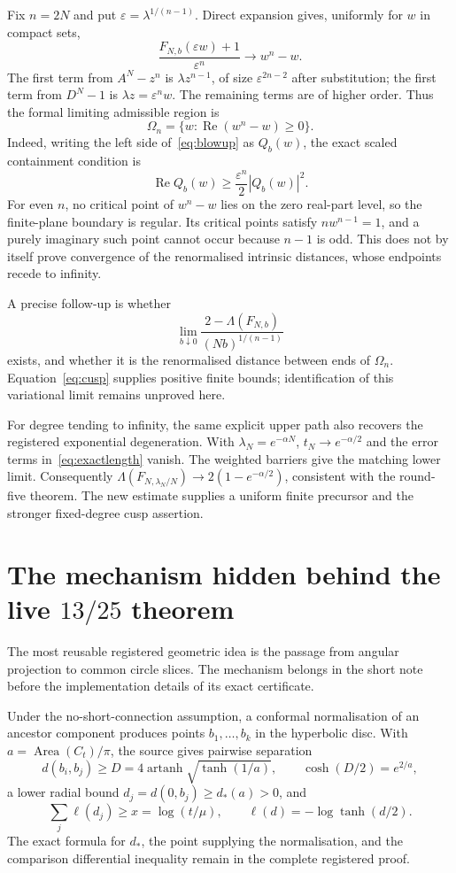 \documentclass[11pt,a4paper]{article}
\theoremstyle{remark}\newtheorem{remark}[theorem]{Remark}
\newcommand{\Area}{\operatorname{Area}}
\newcommand{\Rea}{\operatorname{Re}}
\begin{document}
Fix $n=2N$ and put $\varepsilon=\lambda^{1/(n-1)}$. Direct expansion gives,
uniformly for $w$ in compact sets,
\begin{equation}\label{eq:blowup}
 \frac{F_{N,b}(\varepsilon w)+1}{\varepsilon^n}
 \longrightarrow w^n-w.
\end{equation}
The first term from $A^N-z^n$ is $\lambda z^{n-1}$, of size
$\varepsilon^{2n-2}$ after substitution; the first term from $D^N-1$ is
$\lambda z=\varepsilon^nw$. The remaining terms are of higher order.
Thus the formal limiting admissible region is
\[
 \Omega_n=\{w:\Rea(w^n-w)\ge0\}.
\]
Indeed, writing the left side of~\eqref{eq:blowup} as $Q_b(w)$, the exact
scaled containment condition is
\[
 \Rea Q_b(w)\ge\frac{\varepsilon^n}{2}|Q_b(w)|^2.
\]
For even $n$, no critical point of $w^n-w$ lies on the zero real-part level,
so the finite-plane boundary is regular. Its critical points satisfy
$nw^{n-1}=1$, and a purely imaginary such point cannot occur because $n-1$
is odd. This does not by itself prove convergence of the renormalised
intrinsic distances, whose endpoints recede to infinity.

A precise follow-up is whether
\[
 \lim_{b\downarrow0}
 \frac{2-\Lambda(F_{N,b})}{(Nb)^{1/(n-1)}}
\]
exists, and whether it is the renormalised distance between ends of
$\Omega_n$. Equation~\eqref{eq:cusp} supplies positive finite bounds;
identification of this variational limit remains unproved here.

For degree tending to infinity, the same explicit upper path also recovers
the registered exponential degeneration. With $\lambda_N=e^{-\alpha N}$,
$t_N\to e^{-\alpha/2}$ and the error terms in~\eqref{eq:exactlength} vanish.
The weighted barriers give the matching lower limit. Consequently
$\Lambda(F_{N,\lambda_N/N})\to2(1-e^{-\alpha/2})$, consistent with the
round-five theorem. The new estimate supplies a uniform finite precursor
and the stronger fixed-degree cusp assertion.

\section{The mechanism hidden behind the live $13/25$ theorem}

The most reusable registered geometric idea is the passage from angular
projection to common circle slices. The mechanism belongs in the short note
before the implementation details of its exact certificate.

Under the no-short-connection assumption, a conformal normalisation of an
ancestor component produces points $b_1,\ldots,b_k$ in the hyperbolic disc.
With $a=\Area(C_t)/\pi$, the source gives pairwise separation
\[
 d(b_i,b_j)\ge D=4\operatorname{artanh}\sqrt{\tanh(1/a)},
 \qquad \cosh(D/2)=e^{2/a},
\]
a lower radial bound $d_j=d(0,b_j)\ge d_*(a)>0$, and
\[
 \sum_j\ell(d_j)\ge x=\log(t/\mu),\qquad
 \ell(d)=-\log\tanh(d/2).
\]
The exact formula for $d_*$, the point supplying the normalisation, and the
comparison differential inequality remain in the complete registered proof.
\end{document}
